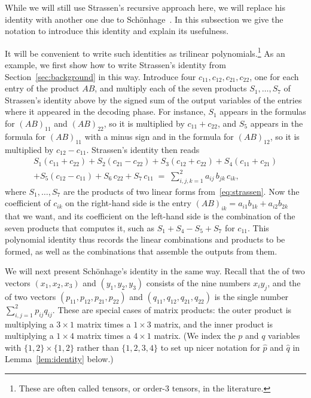 While we will still use Strassen's recursive approach here, we will replace his identity with another one due to Sch\"onhage~\cite{Sch81}. In this subsection we give the notation to introduce this identity and explain its usefulness.

It will be convenient to write such identities as trilinear polynomials.\footnote{These are often called tensors, or order-3 tensors, in the literature.} As an example, we first show how to write Strassen's identity from Section~\ref{sec:background} in this way. Introduce four  $c_{11},c_{12},c_{21},c_{22}$, one for each entry of the product $AB$, and multiply each of the seven products $S_1,\dots,S_7$ of Strassen's identity above by the signed sum of the output variables of the entries where it appeared in the decoding phase. For instance, $S_1$ appears in the formulas for $(AB)_{11}$ and $(AB)_{22}$, so it is multiplied by $c_{11}+c_{22}$, and $S_5$ appears in the formula for $(AB)_{11}$ with a minus sign and in the formula for $(AB)_{12}$, so it is multiplied by $c_{12}-c_{11}$. Strassen's identity then reads
\begin{multline*}
S_1(c_{11}+c_{22})+S_2(c_{21}-c_{22})+S_3(c_{12}+c_{22})+S_4(c_{11}+c_{21})\\
+S_5(c_{12}-c_{11})+S_6\,c_{22}+S_7\,c_{11}\;=\;\sum_{i,j,k=1}^{2}a_{ij}\,b_{jk}\,c_{ik},
\end{multline*}
where $S_1,\dots,S_7$ are the products of two linear forms from~\eqref{eq:strassen}. Now the coefficient of $c_{ik}$ on the right-hand side is the entry $(AB)_{ik}=a_{i1}b_{1k}+a_{i2}b_{2k}$ that we want, and its coefficient on the left-hand side is the combination of the seven products that computes it, such as $S_1+S_4-S_5+S_7$ for $c_{11}$. This polynomial identity thus records the linear combinations and products to be formed, as well as the combinations that assemble the outputs from them.

We will next present Sch\"onhage's identity in the same way. 
Recall that the  of two vectors $(x_1,x_2,x_3)$ and $(y_1,y_2,y_3)$ consists of the nine numbers $x_iy_j$, and the  of two vectors $(p_{11},p_{12},p_{21},p_{22})$ and $(q_{11},q_{12},q_{21},q_{22})$ is the single number $\sum_{i,j=1}^{2}p_{ij}q_{ij}$. These are special cases of matrix products: the outer product is multiplying a $3\times1$ matrix times a $1\times3$ matrix, and the inner product is multiplying a $1\times4$ matrix times a $4\times1$ matrix. (We index the $p$ and $q$ variables with $\{1,2\} \times \{1,2\}$ rather than $\{1,2,3,4\}$ to set up nicer notation for $\hat{p}$ and $\hat{q}$ in Lemma~\ref{lem:identity} below.)

